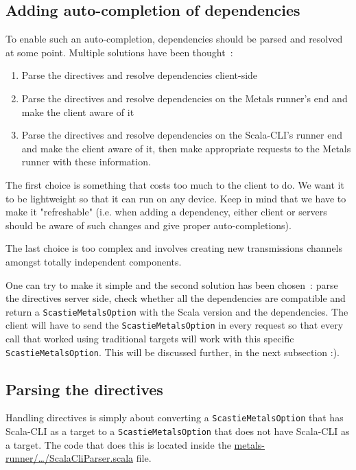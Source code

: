 \documentclass{article}
\begin{document}
\subsection{Adding auto-completion of dependencies}

To enable such an auto-completion, dependencies should be parsed and resolved at some point. Multiple solutions have been thought~:

\begin{enumerate}
    \item Parse the directives and resolve dependencies client-side
    \item Parse the directives and resolve dependencies on the Metals runner's end and make the client aware of it
    \item Parse the directives and resolve dependencies on the Scala-CLI's runner end and make the client aware of it, then make appropriate requests to the Metals runner with these information.
\end{enumerate}

The first choice is something that costs too much to the client to do. We want it to be lightweight so that it can run on any device. Keep in mind that we have to make it "refreshable" (i.e. when adding a dependency, either client or servers should be aware of such changes and give proper auto-completions).

The last choice is too complex and involves creating new transmissions channels amongst totally independent components.

One can try to make it simple and the second solution has been chosen~: parse the directives server side, check whether all the dependencies are compatible and return a \lstinline{ScastieMetalsOption} with the Scala version and the dependencies. The client will have to send the \lstinline{ScastieMetalsOption} in every request so that every call that worked using traditional targets will work with this specific \lstinline{ScastieMetalsOption}. This will be discussed further, in the next subsection :).

\subsection{Parsing the directives}

Handling directives is simply about converting a \lstinline{ScastieMetalsOption} that has Scala-CLI as a target to a \lstinline{ScastieMetalsOption} that does not have Scala-CLI as a target. The code that does this is located inside the \href{https://github.com/Maeeen/scastie/blob/main/metals-runner/src/main/scala/scastie/metals/ScalaCliParser.scala#LL47C14-L47C14}{metals-runner/\ldots/ScalaCliParser.scala} file.
\end{document}
